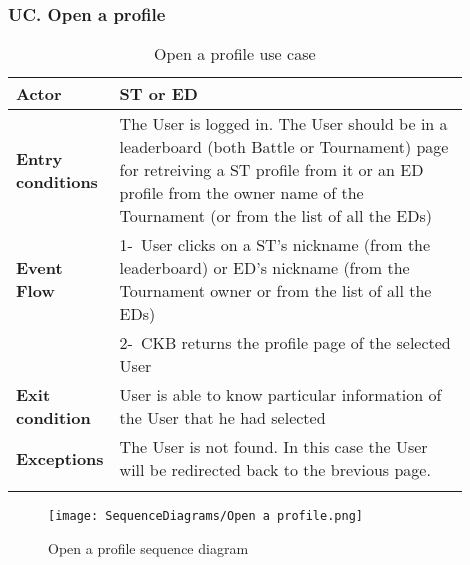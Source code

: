 \subsubsection*{UC\cuc . Open a profile}
\begin{center}
    \begin{longtable}{|l|p{0.9\linewidth}|}
        \hline
        \textbf{Actor}            & ST or ED                                                                                                                                                                                       \\
        \hline
        \textbf{Entry conditions} & The User is logged in. The User should be in a leaderboard (both Battle or Tournament) page for retreiving a ST profile from it or an ED profile from the owner name of the Tournament (or from the list of all the EDs)        \\
        \hline
        \textbf{Event Flow}       & 1-\ User clicks on a ST's nickname (from the leaderboard) or ED's nickname (from the Tournament owner or from the list of all the EDs)        \\
        & 2-\ CKB returns the profile page of the selected User        \\
        \hline
        \textbf{Exit condition}   & User is able to know particular information of the User that he had selected        \\
        \hline
        \textbf{Exceptions}        &  The User is not found. In this case the User will be redirected back to the brevious page.\\
        \hline
        \caption{Open a profile use case}
        \label{tab: open_a_profile_use_case}
    \end{longtable}
\end{center}

\begin{figure}[H]
    \begin{center}
        \texttt{[image: SequenceDiagrams/Open a profile.png]}
        \caption{Open a profile sequence diagram}
        \label{fig:open_a_profile_seqd}%
    \end{center}
\end{figure}

